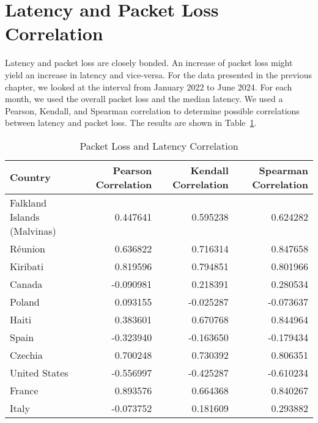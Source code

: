 \section{Latency and Packet Loss Correlation} \label{sec:latency-packetloss-correlation}

Latency and packet loss are closely bonded. An increase of packet loss might yield an increase in latency and vice-versa.
For the data presented in the previous chapter, we looked at the interval from January 2022 to June 2024.
For each month, we used the overall packet loss and the median latency.
We used a Pearson, Kendall, and Spearman correlation to determine possible correlations between latency and packet loss.
The results are shown in Table~\ref{fig:packetloss-latency-correlation}.

\begin{table}
	\caption{Packet Loss and Latency Correlation}
	\label{fig:packetloss-latency-correlation}
	\begin{tabular}{lrrr}
		\toprule
		Country                     & Pearson Correlation & Kendall Correlation & Spearman Correlation \\
		\midrule
		Falkland Islands (Malvinas) & 0.447641            & 0.595238            & 0.624282             \\
		Réunion                     & 0.636822            & 0.716314            & 0.847658             \\
		Kiribati                    & 0.819596            & 0.794851            & 0.801966             \\
		Canada                      & -0.090981           & 0.218391            & 0.280534             \\
		Poland                      & 0.093155            & -0.025287           & -0.073637            \\
		Haiti                       & 0.383601            & 0.670768            & 0.844964             \\
		Spain                       & -0.323940           & -0.163650           & -0.179434            \\
		Czechia                     & 0.700248            & 0.730392            & 0.806351             \\
		United States               & -0.556997           & -0.425287           & -0.610234            \\
		France                      & 0.893576            & 0.664368            & 0.840267             \\
		Italy                       & -0.073752           & 0.181609            & 0.293882             \\

\end{tabular}
\end{table}
